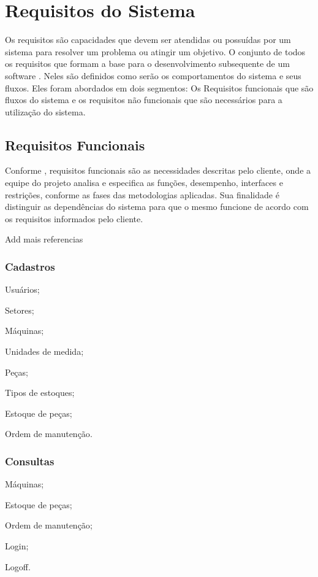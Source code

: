 \chapter{Requisitos do Sistema}

Os requisitos são capacidades que devem ser atendidas ou possuídas por um sistema para resolver um problema ou atingir um objetivo. O conjunto de todos os requisitos que formam a base para o desenvolvimento subsequente de um software \cite{vazquez2016}. Neles são definidos como serão os comportamentos do sistema e seus fluxos. Eles foram  abordados em dois segmentos: Os Requisitos funcionais que são fluxos do sistema e os requisitos não funcionais que são necessários para a utilização do sistema.

\section{Requisitos Funcionais}

{ Conforme \cite{essi2005}, requisitos funcionais são as necessidades descritas pelo cliente, onde a equipe do projeto analisa e
	especifica as funções, desempenho, interfaces e restrições, conforme as fases das metodologias aplicadas. Sua finalidade é distinguir as dependências do sistema para que o mesmo funcione de acordo com os requisitos informados pelo cliente. }

{\color{red} Add mais referencias}

\subsection{Cadastros}


\begin{subalineas}
	\item {Usuários};
	\item {Setores};
	\item {Máquinas};
	\item {Unidades de medida};
	\item {Peças};
	\item {Tipos de estoques};
	\item {Estoque de peças};
	\item {Ordem de manutenção}.
\end{subalineas}

\subsection{Consultas}
\begin{subalineas}
	\item {Máquinas};
	\item {Estoque de peças};
	\item {Ordem de manutenção};
	\item {Login};
	\item {Logoff}.
\end{subalineas}

